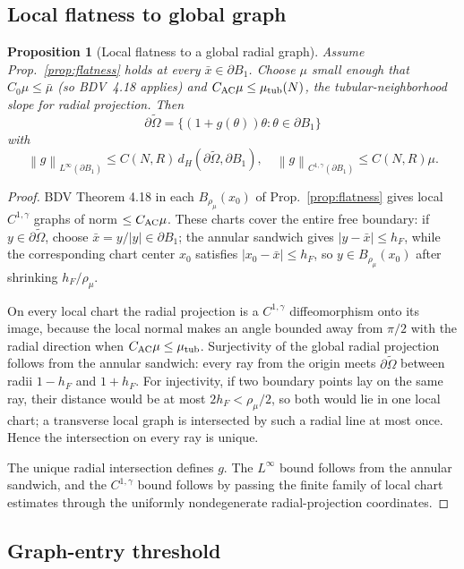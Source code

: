 \documentclass[11pt]{amsart}
\newtheorem{proposition}[theorem]{Proposition}
\theoremstyle{definition}
\newcommand{\norm}[1]{\left\|#1\right\|}
\newcommand{\abs}[1]{\left|#1\right|}
\begin{document}
\subsection{Local flatness to global graph}

\begin{proposition}[Local flatness to a global radial graph]\label{prop:globalgraph}
Assume Prop.~\ref{prop:flatness} holds at every $\bar x\in\partial B_1$.
Choose $\mu$ small enough that $C_0\mu\le\bar\mu$ (so BDV~4.18 applies) and
$C_{\rm AC}\mu\le\mu_{\rm tub}(N)$, the tubular-neighborhood slope for radial
projection. Then
\[
\partial\widetilde\Omega=\{(1+g(\theta))\theta:\theta\in\partial B_1\}
\]
with
\[
\norm{g}_{L^\infty(\partial B_1)}\le C(N,R)\,d_H(\partial\widetilde\Omega,\partial B_1),
\quad
\norm{g}_{C^{1,\gamma}(\partial B_1)}\le C(N,R)\mu.
\]
\end{proposition}

\begin{proof}
BDV Theorem 4.18 in each $B_{\rho_\mu}(x_0)$ of Prop.~\ref{prop:flatness}
gives local $C^{1,\gamma}$ graphs of norm $\le C_{\rm AC}\mu$. These charts
cover the entire free boundary: if $y\in\partial\widetilde\Omega$, choose
$\bar x=y/\abs y\in\partial B_1$; the annular sandwich gives
$\abs{y-\bar x}\le h_F$, while the corresponding chart center $x_0$ satisfies
$\abs{x_0-\bar x}\le h_F$, so $y\in B_{\rho_\mu}(x_0)$ after shrinking
$h_F/\rho_\mu$.

On every local chart the radial projection is a $C^{1,\gamma}$ diffeomorphism
onto its image, because the local normal makes an angle bounded away from
$\pi/2$ with the radial direction when $C_{\rm AC}\mu\le\mu_{\rm tub}$.
Surjectivity of the global radial projection follows from the annular
sandwich: every ray from the origin meets $\partial\widetilde\Omega$ between
radii $1-h_F$ and $1+h_F$. For injectivity, if two boundary points lay on the
same ray, their distance would be at most $2h_F<\rho_\mu/2$, so both would lie
in one local chart; a transverse local graph is intersected by such a radial
line at most once. Hence the intersection on every ray is unique.

The unique radial intersection defines $g$. The $L^\infty$ bound follows from
the annular sandwich, and the $C^{1,\gamma}$ bound follows by passing the
finite family of local chart estimates through the uniformly nondegenerate
radial-projection coordinates.
\end{proof}

\subsection{Graph-entry threshold}
\end{document}
